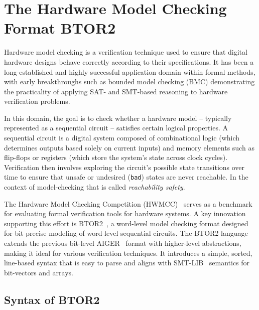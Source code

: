 \section{The Hardware Model Checking Format BTOR2}\label{sec:btor2}

Hardware model checking is a verification technique used to ensure that digital hardware designs behave correctly according to their specifications. It has been a long-established and highly successful application domain within formal methods, with early breakthroughs such as bounded model checking (BMC) \cite{boundedMC} demonstrating the practicality of applying SAT- and SMT-based reasoning to hardware verification problems.

In this domain, the goal is to check whether a hardware model -- typically represented as a sequential circuit -- satisfies certain logical properties. A sequential circuit is a digital system composed of combinational logic (which determines outputs based solely on current inputs) and memory elements such as flip-flops or registers (which store the system's state across clock cycles). Verification then involves exploring the circuit's possible state transitions over time to ensure that unsafe or undesired (\verb|bad|) states are never reachable. In the context of model-checking that is called \textit{reachability safety}.


The Hardware Model Checking Competition (HWMCC)~\cite{hwmcc} serves as a benchmark for evaluating formal verification tools for hardware systems. A key innovation supporting this effort is BTOR2~\cite{btor2}, a word-level model checking format designed for bit-precise modeling of word-level sequential circuits.
The BTOR2 language extends the previous bit-level AIGER~\cite{AIGER} format with higher-level abstractions, making it ideal for various verification techniques. It introduces a simple, sorted, line-based syntax that is easy to parse and aligns with SMT-LIB~\cite{SMT-LIB} semantics for bit-vectors and arrays.

\subsection{Syntax of BTOR2}

